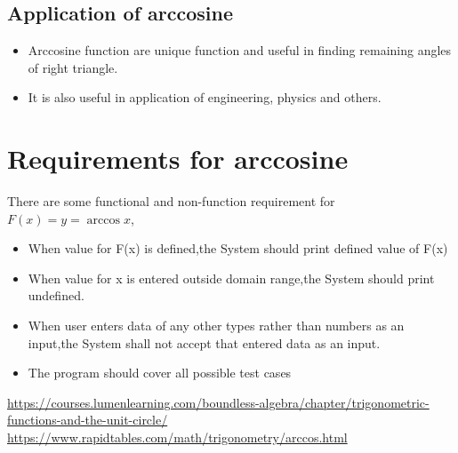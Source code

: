 \documentclass[a4paper,10pt]{report}
\begin{document}
\subsection{Application of arccosine}
\begin{itemize}[noitemsep]
\item Arccosine function are unique function and useful in finding remaining angles of right triangle.
\item It is also useful in application of engineering, physics and others.
\end{itemize}
\section{Requirements for arccosine}
There are some functional and non-function requirement for $F(x)=y=\arccos x$,
\begin{itemize}[noitemsep]
\item When value for F(x) is defined,the System should print  defined value of F(x)
\item When value for x is entered outside domain range,the System should print undefined.
\item When user enters data of any other types rather than numbers as an input,the System shall not accept that entered data as an input.
\item The program should cover all possible test cases
\end{itemize}

\begin{thebibliography}{9}
\url{https://courses.lumenlearning.com/boundless-algebra/chapter/trigonometric-functions-and-the-unit-circle/}
\url{https://www.rapidtables.com/math/trigonometry/arccos.html}
\end{thebibliography}
\end{document}
